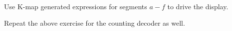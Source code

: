 %
%
%
\begin{problem}
Use  K-map generated expressions for segments $a-f$  to drive the display.
\end{problem}
%
\begin{problem}
Repeat the above exercise for the counting decoder as well.
\end{problem}
%



